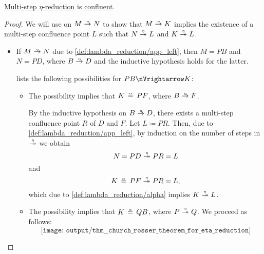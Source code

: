 \begin{theorem}\label{thm:church_rosser_theorem_for_eta_reduction}
  \hyperref[def:beta_eta_reduction]{Multi-step \( \eta \)-reduction} is \hyperref[def:relation_confluence]{confluent}.
\end{theorem}
\begin{proof}
   We will use  on \( M \ered N \) to show that \( M \ered K \) implies the existence of a multi-step confluence point \( L \) such that \( N \ered* L \) and \( K \ered* L \).

  \begin{itemize}
    \item If \( M \ered N \) due to \ref{def:lambda_reduction/app_left}, then \( M = PB \) and \( N = PD \), where \( B \ered D \) and the inductive hypothesis holds for the latter.

     lists the following possibilities for \( PB \pred K \):
    \begin{itemize}
      \item The possibility  implies that \( K \aequiv PF \), where \( B \ered F \).

      By the inductive hypothesis on \( B \ered D \), there exists a multi-step confluence point \( R \) of \( D \) and \( F \). Let \( L \coloneqq PR \). Then, due to \ref{def:lambda_reduction/app_left}, by induction on the number of steps in \( {\ered*} \) we obtain
      \begin{equation*}
        N = PD \ered* PR = L
      \end{equation*}
      and
      \begin{equation*}
        K \aequiv PF \ered* PR = L,
      \end{equation*}
      which due to \ref{def:lambda_reduction/alpha} implies \( K \ered* L \).

      \item The possibility  implies that \( K \aequiv QB \), where \( P \ered* Q \). We proceed as follows:
      \begin{equation*}
        \texttt{[image: output/thm\_\_church\_rosser\_theorem\_for\_eta\_reduction]}
      \end{equation*}
    \end{itemize}


\end{itemize}
\end{proof}
